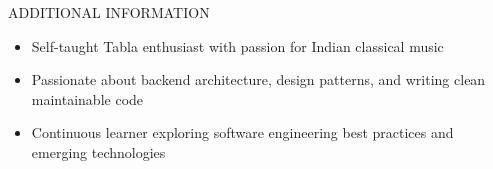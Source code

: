 \documentclass{resume} %
\begin{document}

\begin{rSection}{ADDITIONAL INFORMATION}

\begin{itemize}
    \itemsep -3pt {}
    \item Self-taught Tabla enthusiast with passion for Indian classical music
    \item Passionate about backend architecture, design patterns, and writing clean maintainable code
    \item Continuous learner exploring software engineering best practices and emerging technologies
\end{itemize}

\end{rSection}
\end{document}
